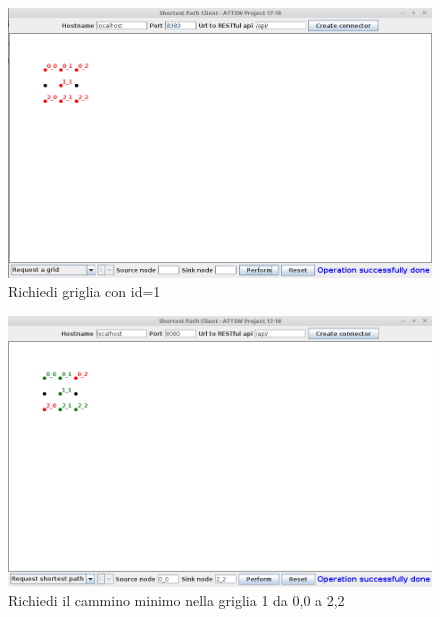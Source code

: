 \begin{figure}[ht]
	\centering
	\includegraphics[width=0.7\linewidth]{Chapters/3}
	\caption[Interfaccia utente]{Richiedi griglia con id=1}
	\label{fig:3}
\end{figure}

\begin{figure}[ht]
	\centering
	\includegraphics[width=0.7\linewidth]{Chapters/4}
	\caption[Interfaccia utente]{Richiedi il cammino minimo nella griglia 1 da 0,0 a 2,2}
	\label{fig:4}
\end{figure}

